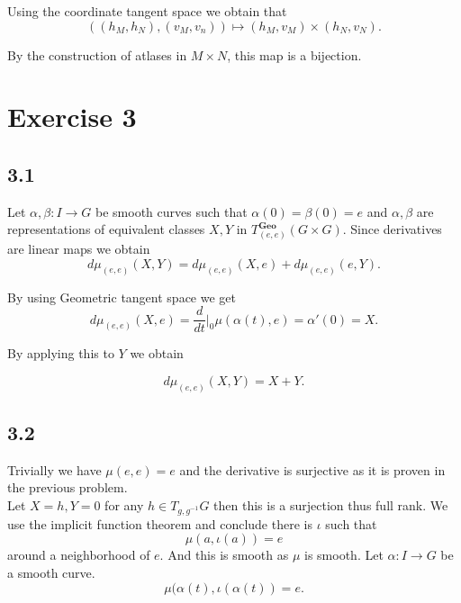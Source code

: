 \documentclass{article}
\numberwithin{equation}{section}
\begin{document}
Using the coordinate tangent space we obtain that 
\begin{equation*}
((h_M,h_N),(v_M,v_n)) \mapsto (h_M,v_M)\times(h_N,v_N).
\end{equation*}

By the construction of atlases in $M\times N$, this map is a bijection. 

\section*{Exercise 3}

\subsection*{3.1}

Let $\alpha,\beta:I\to G$ be smooth curves such that $\alpha(0)=\beta(0)=e$ and $\alpha,\beta$ are representations of equivalent classes $X,Y$ in $T_{(e,e)}^{\mathbf{Geo}}(G\times G)$. Since derivatives are linear maps we obtain
\begin{equation*}
d\mu_{(e,e)}(X,Y) = d\mu_{(e,e)}(X,e)+d\mu_{(e,e)}(e,Y).  
\end{equation*}

By using Geometric tangent space we get
\begin{equation*}
d\mu_{(e,e)}(X,e) = {\frac d {dt}}|_0\mu(\alpha(t),e) = \alpha'(0) = X.
\end{equation*}

By applying this to $Y$ we obtain

\begin{equation*}
d\mu_{(e,e)}(X,Y) = X+Y.
\end{equation*}

\subsection*{3.2}

Trivially we have $\mu(e,e) =e$ and the derivative is surjective as it is proven in the previous problem. \\
Let $X=h, Y=0$ for any $h\in T_{g,g^{-1}}G$ then this is a surjection thus full rank. We use the implicit function theorem and conclude there is $\iota$ such that
\begin{equation*}
\mu(a,\iota(a))=e
\end{equation*}
around a neighborhood of $e$. And this is smooth as $\mu$ is smooth. Let $\alpha:I\to G$ be a smooth curve.
\begin{equation*}
\mu(\alpha(t),\iota(\alpha(t)) = e.
\end{equation*}
\end{document}
